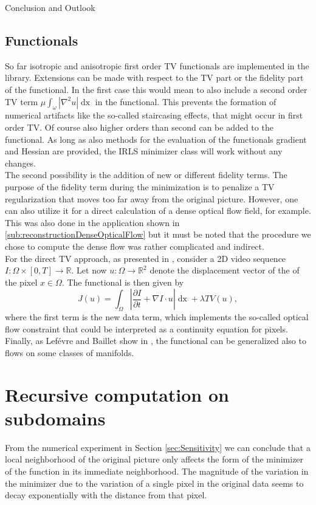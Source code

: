 \begin{chapter}{Conclusion and Outlook}
\subsection{Functionals} %
\label{sub:Functionals}
So far isotropic and anisotropic first order TV functionals are implemented in the library. Extensions can be made with respect to the TV part or the fidelity
part of the functional. In the first case this would mean to also include a second order TV term $\mu\int_{\omega}|\nabla^2u|\mathop{dx}$ in the functional.
This prevents the formation of numerical artifacts like the so-called staircasing effects, that might occur in first order TV. Of course also higher orders than second
can be added to the functional. As long as also methods for the evaluation of the functionals gradient and Hessian are provided, the IRLS minimizer class will
work without any changes. \\

The second possibility is the addition of new or different fidelity terms. The purpose of the fidelity term during the minimization is to penalize a TV
regularization that moves too far away from the original picture. However, one can also utilize it for a direct calculation of a dense optical flow field, for
example. This was also done in the application shown in \ref{sub:reconstructionDenseOpticalFlow} but it must be noted that the procedure we chose to compute 
the dense flow was rather complicated and indirect.\\

For the direct TV approach, as presented in \cite{SceneFlow}, consider a 2D video sequence $I:\Omega\times [0,T]\to\mathbb{R}$.
Let now $u:\Omega\to\mathbb{R}^2$ denote the displacement vector of the of the pixel $x\in\Omega$. The functional is then given by
\begin{equation}
    J(u)=\int_{\Omega}\left\vert\frac{\partial I}{\partial t}+\nabla I\cdot u\right\vert\mathop{dx}+\lambda TV(u),
\end{equation}
where the first term is the new data term, which implements the so-called optical flow constraint that could be interpreted as a continuity equation for pixels.
Finally, as Lef\'{e}vre and Baillet show in \cite{manifoldFlow}, the functional can be generalized also to flows on some classes of manifolds.


\section{Recursive computation on subdomains} %
\label{sec:Recursivecomputationonsubdomains}
From the numerical experiment in Section \ref{sec:Sensitivity} we can conclude that a local neighborhood of the original picture only affects the form of the minimizer of the function
in its immediate neighborhood. The magnitude of the variation in the minimizer due to the variation of a single pixel in the original data seems to decay exponentially with the
distance from that pixel. \\


\end{chapter}
